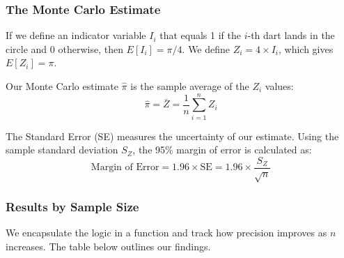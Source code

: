 \documentclass[
  letterpaper,
  DIV=11,
  numbers=noendperiod]{scrreprt}
\begin{document}
\subsubsection{The Monte Carlo Estimate}\label{the-monte-carlo-estimate}

If we define an indicator variable \(I_i\) that equals 1 if the \(i\)-th
dart lands in the circle and 0 otherwise, then \(E[I_i] = \pi/4\). We
define \(Z_i = 4 \times I_i\), which gives \(E[Z_i] = \pi\).

Our Monte Carlo estimate \(\hat{\pi}\) is the sample average of the
\(Z_i\) values: \[
\hat{\pi} = \bar{Z} = \frac{1}{n}\sum_{i=1}^n Z_i
\]

The Standard Error (SE) measures the uncertainty of our estimate. Using
the sample standard deviation \(S_Z\), the 95\% margin of error is
calculated as: \[
\text{Margin of Error} = 1.96 \times \text{SE} = 1.96 \times \frac{S_Z}{\sqrt{n}}
\]

\subsubsection{Results by Sample Size}\label{results-by-sample-size}

We encapsulate the logic in a function and track how precision improves
as \(n\) increases. The table below outlines our findings.
\end{document}
